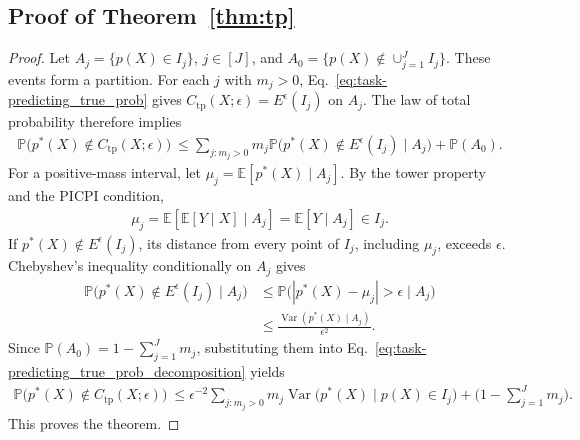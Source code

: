 \documentclass[11pt]{article}
\theoremstyle{statplain}
\theoremstyle{statdefinition}
\DeclareMathOperator{\Var}{Var}
\newcommand{\tp}{\mathrm{tp}}
\newcommand{\E}{\mathbb{E}}
\newcommand{\PP}{\mathbb{P}}
\newcommand{\0}{\mathbf{0}}
\newcommand{\J}{\mathcal{J}}
\newcommand{\interval}{I} %
\newcommand{\numInterval}{J} %
\newcommand{\iteratorInterval}{j}
\newcommand{\titleShort}{PICPI\xspace}
\begin{document}




\subsection{Proof of Theorem~\ref{thm:tp}}
\label{proof_thm:tp}
\begin{proof}
Let $A_j=\{p(X)\in\interval_j\}$, $j\in[\numInterval]$, and
$A_0=\{p(X)\notin\cup_{j=1}^{\numInterval}\interval_j\}$.
These events form a partition. For each $j$ with $m_j>0$, Eq.~\eqref{eq:task-predicting_true_prob} gives $C_{\tp}(X;\epsilon)=E^\epsilon(\interval_j)$ on $A_j$.
The law of total probability therefore implies
\begin{align}\label{eq:task-predicting_true_prob_decomposition}
 \PP\Big(p^*(X)\notin C_{\tp}(X;\epsilon)\Big)~\leq\sum_{j:m_j>0}m_j
 \PP\Big(p^*(X)\notin E^\epsilon(\interval_j)\mid A_j\Big)
 +\PP(A_0).
\end{align}
For a positive-mass interval, let $\mu_j=\E[p^*(X)\mid A_j]$.
By the tower property and the \titleShort condition,
\begin{align*}
 \mu_j=\E[\E[Y\mid X]\mid A_j]=\E[Y\mid A_j]\in\interval_j.
\end{align*}
If $p^*(X)\notin E^\epsilon(\interval_j)$, its distance from every
point of $\interval_j$, including $\mu_j$, exceeds $\epsilon$.
Chebyshev's inequality conditionally on $A_j$ gives
\begin{align*}
 \PP\Big(p^*(X)\notin E^\epsilon(\interval_j)\mid A_j\Big)
 &\leq\PP\Big(|p^*(X)-\mu_j|>\epsilon\mid A_j\Big)\\
 &\leq\frac{\Var(p^*(X)\mid A_j)}{\epsilon^2}.
\end{align*}
Since $\PP(A_0)=1-\sum_{j=1}^{\numInterval}m_j$, substituting them into Eq.~\eqref{eq:task-predicting_true_prob_decomposition} yields
\begin{align*}
 \PP\Big(p^*(X)\notin C_{\tp}(X;\epsilon)\Big)~\leq\epsilon^{-2}\sum_{j:m_j>0}m_j
 \Var\Big(p^*(X)\mid p(X)\in\interval_j\Big)
 +\Big(1-\sum_{j=1}^{\numInterval}m_j\Big).
\end{align*}
This proves the theorem.
\end{proof}
\end{document}
